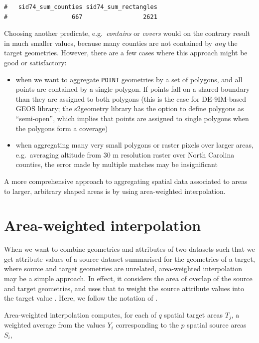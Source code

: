 \documentclass[]{book}
\providecommand{\tightlist}{%
  \setlength{\itemsep}{0pt}\setlength{\parskip}{0pt}}
\begin{document}
\begin{verbatim}
#   sid74_sum_counties sid74_sum_rectangles 
#                  667                 2621
\end{verbatim}

Choosing another predicate, e.g.~\emph{contains} or \emph{covers} would on
the contrary result in much smaller values, because many counties
are not contained by \emph{any} the target geometries. However, there are
a few cases where this approach might be good or satisfactory:

\begin{itemize}
\tightlist
\item
  when we want to aggregate \texttt{POINT} geometries by a set of polygons,
  and all points are contained by a single polygon. If points fall on a
  shared boundary than they are assigned to both polygons (this is
  the case for DE-9IM-based GEOS library; the s2geometry library has
  the option to define polygons as ``semi-open'', which implies that
  points are assigned to single polygons when the polygons form a
  coverage)
\item
  when aggregating many very small polygons or raster pixels over
  larger areas, e.g.~averaging altitude from 30 m resolution raster
  over North Carolina counties, the error made by multiple matches
  may be insignificant
\end{itemize}

A more comprehensive approach to aggregating spatial data associated
to areas to larger, arbitrary shaped areas is by using area-weighted
interpolation.

\hypertarget{area-weighted}{%
\section{Area-weighted interpolation}\label{area-weighted}}

When we want to combine geometries and attributes of two datasets
such that we get attribute values of a source dataset summarised for
the geometries of a target, where source and target geometries are
unrelated, area-weighted interpolation may be a simple approach. In
effect, it considers the area of overlap of the source and target
geometries, and uses that to weight the source attribute values into
the target value \citep{goodchild, thomas, do, Do2021}. Here, we follow the
notation of \citet{do}.

Area-weighted interpolation computes, for each of \(q\) spatial target
areas \(T_j\), a weighted average from the values \(Y_i\) corresponding
to the \(p\) spatial source areas \(S_i\),
\end{document}
